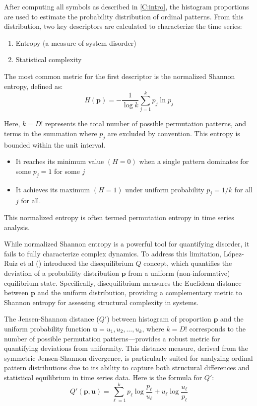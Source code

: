 After computing all symbols as described in \ref{C:intro}, the histogram proportions are used to estimate the probability distribution of ordinal patterns. From this distribution, two key descriptors are calculated to characterize the time series:
\begin{enumerate}
\item Entropy (a measure of system disorder)

\item Statistical complexity
\end{enumerate}
The most common metric for the first descriptor is the normalized Shannon entropy, defined as:
\begin{equation}
	H(\mathbf{p})=-\dfrac{1}{\log k}\sum^{k}_{j=1}p_j \ln{p_j}
\end{equation}

Here, $k=D!$ represents the total number of possible permutation patterns, and terms in the summation where $p_j$ are excluded by convention. This entropy is bounded within the unit interval.

\begin{itemize}
\item It reaches its minimum value $(H=0)$ when a single pattern dominates  for some $p_j=1$ for some $j$ 
\item It achieves its maximum $(H=1)$ under uniform probability $p_j=1/k$ for all $j$ for all. 
\end{itemize}

This normalized entropy is often termed permutation entropy in time series analysis. 

While normalized Shannon entropy is a powerful tool for quantifying disorder, it fails to fully characterize complex dynamics. To address this limitation, López-Ruiz et al (\cite{lopez1995statistical}) introduced the disequilibrium $Q$ concept, which quantifies the deviation of a probability distribution $\mathbf{p}$ from a uniform (non-informative) equilibrium state. Specifically, disequilibrium measures the Euclidean distance between $\mathbf{p}$ and the uniform distribution, providing a complementary metric to Shannon entropy for assessing structural complexity in systems.

The Jensen-Shannon distance ($Q'$) between histogram of proportion $\mathbf{p}$ and the uniform probability function $\mathbf{u}=u_1,u_2,\dots, u_k$, where $k=D!$ corresponds to the number of possible permutation patterns—provides a robust metric for quantifying deviations from uniformity. This distance measure, derived from the symmetric Jensen-Shannon divergence, is particularly suited for analyzing ordinal pattern distributions due to its ability to capture both structural differences and statistical equilibrium in time series data.
Here is the formula for $Q'$:
\begin{equation}
	Q'(\mathbf{p,u})=\sum^k_{\ell=1} p_\ell\log\dfrac{p_\ell}{u_\ell}+u_\ell\log\dfrac{u_\ell}{p_\ell}
\end{equation}

